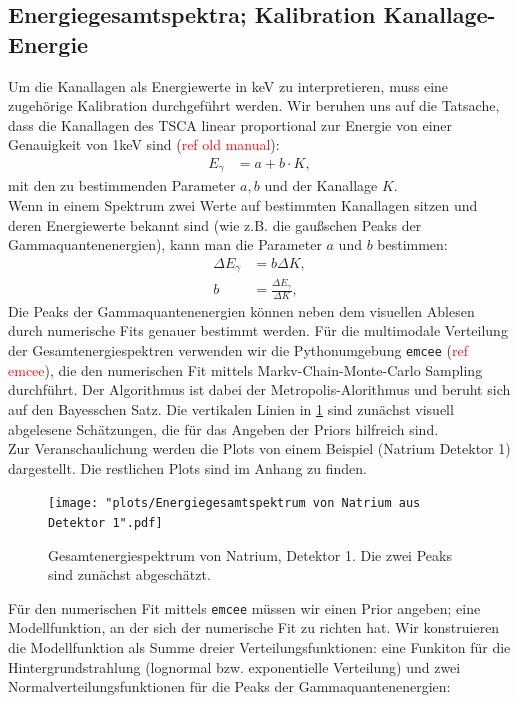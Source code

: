 \documentclass[%
aps,
onecolumn,
11pt,
tightenlines,
nofootinbib,
superscriptaddress,
floatfix,
prd,
]{revtex4-2}
\begin{document}
\subsection{Energiegesamtspektra; Kalibration Kanallage-Energie}
Um die Kanallagen als Energiewerte in keV zu interpretieren, muss eine zugehörige Kalibration durchgeführt werden. Wir beruhen uns auf die Tatsache, dass die Kanallagen des TSCA linear proportional zur Energie von einer Genauigkeit von 1keV sind (\textcolor{red}{ref old manual}):
\begin{align}
	E_{\gamma} &= a + b\cdot K,
	\label{eq:calibrate}
\end{align}
mit den zu bestimmenden Parameter $a,b$ und der Kanallage $K$. \\
Wenn in einem Spektrum zwei Werte auf bestimmten Kanallagen sitzen und deren Energiewerte bekannt sind (wie z.B. die gaußschen Peaks der Gammaquantenenergien), kann man die Parameter $a$ und $b$ bestimmen:
\begin{align}
	\Delta E_{\gamma} &= b \Delta K , \\
	b &= \frac{\Delta E_{\gamma}}{\Delta K},
\end{align}
Die Peaks der Gammaquantenenergien können neben dem visuellen Ablesen durch numerische Fits genauer bestimmt werden. Für die multimodale Verteilung der Gesamtenergiespektren verwenden wir die Pythonumgebung \texttt{emcee} (\textcolor{red}{ref emcee}), die den numerischen Fit mittels Markv-Chain-Monte-Carlo Sampling durchführt. Der Algorithmus ist dabei der Metropolis-Alorithmus und beruht sich auf den Bayesschen Satz. Die vertikalen Linien in \ref{fig:so1initial} sind zunächst visuell abgelesene Schätzungen, die für das Angeben der Priors hilfreich sind.\\
Zur Veranschaulichung werden die Plots von einem Beispiel (Natrium Detektor 1) dargestellt. Die restlichen Plots sind im Anhang zu finden.
\begin{figure}[H]
		\centering
		\texttt{[image: "plots/Energiegesamtspektrum von Natrium aus Detektor 1".pdf]}
		\caption{Gesamtenergiespektrum von Natrium, Detektor 1.
		Die zwei Peaks sind zunächst abgeschätzt.}
		\label{fig:so1initial}
\end{figure}
Für den numerischen Fit mittels \texttt{emcee} müssen wir einen Prior angeben; eine Modellfunktion, an der sich der numerische Fit zu richten hat. Wir konstruieren die Modellfunktion als Summe dreier Verteilungsfunktionen: eine Funkiton für die Hintergrundstrahlung (lognormal bzw. exponentielle Verteilung) und zwei Normalverteilungsfunktionen für die Peaks der Gammaquantenenergien:
\end{document}
